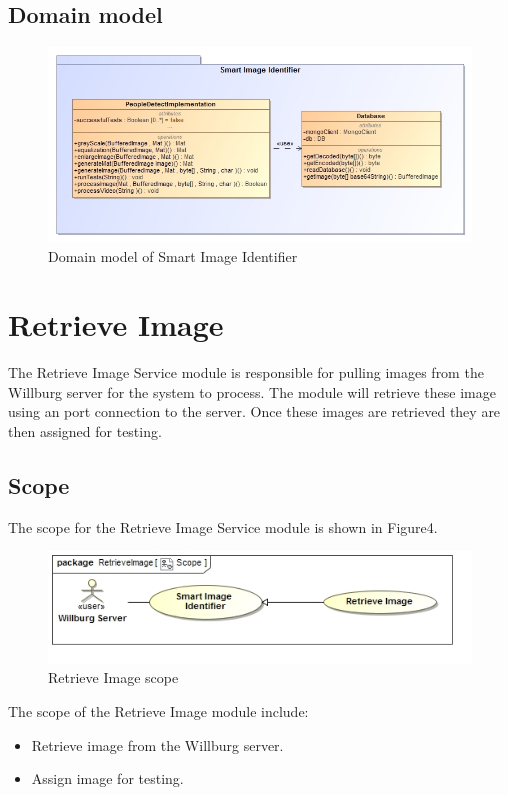 \documentclass[a4paper,12pt]{report}
\begin{document}
	\subsection {Domain model}
	\begin{figure}[htb]
		\centering
		\includegraphics [scale=0.5]{../Diagrams/Model.jpg}
		\caption{Domain model of Smart Image Identifier}
	\end{figure}	
	\FloatBarrier
	


\section {Retrieve Image}
The Retrieve Image Service module is responsible for pulling images from the Willburg server for the system to process. The module will retrieve these image using an port connection to the server. Once these images are retrieved they are then assigned for testing.
	\FloatBarrier
	\subsection {Scope}
		The scope for the Retrieve Image Service module is shown in Figure4.
		\begin{figure}[htb]
			\centering
			\includegraphics [scale=0.5]{../Diagrams/RetrieveImageScope.jpg}
			\caption{Retrieve Image scope}
		\end{figure}	
		\newpage
		The scope of the Retrieve Image module include:
			\begin {itemize}
				\item Retrieve image from the Willburg server.
				\item Assign image for testing.
			\end {itemize}
\end{document}
